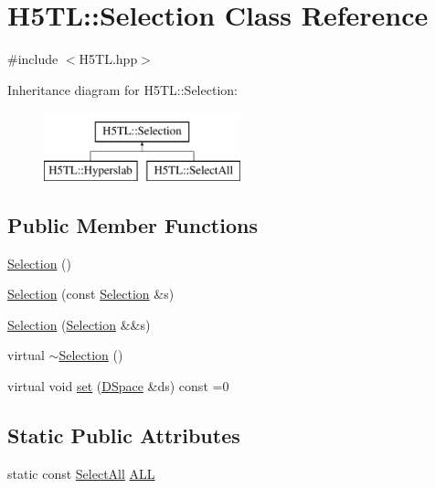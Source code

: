 \hypertarget{class_h5_t_l_1_1_selection}{\section{H5\-T\-L\-:\-:Selection Class Reference}
\label{class_h5_t_l_1_1_selection}
}


{\ttfamily \#include $<$H5\-T\-L.\-hpp$>$}

Inheritance diagram for H5\-T\-L\-:\-:Selection\-:\begin{figure}[H]
\begin{center}
\leavevmode
\includegraphics[height=2.000000cm]{class_h5_t_l_1_1_selection}
\end{center}
\end{figure}
\subsection*{Public Member Functions}
\begin{DoxyCompactItemize}
\item 
\hyperlink{class_h5_t_l_1_1_selection_aeab63be2c41250d0ab36c00356a8f750}{Selection} ()
\item 
\hyperlink{class_h5_t_l_1_1_selection_ab7e340d2861f5e60b0e80381d39ba0c3}{Selection} (const \hyperlink{class_h5_t_l_1_1_selection}{Selection} \&s)
\item 
\hyperlink{class_h5_t_l_1_1_selection_a9594895f58f917d8c450c66583d3f7ff}{Selection} (\hyperlink{class_h5_t_l_1_1_selection}{Selection} \&\&s)
\item 
virtual \hyperlink{class_h5_t_l_1_1_selection_a171d5093cb878eb3e30d0779667fbb13}{$\sim$\-Selection} ()
\item 
virtual void \hyperlink{class_h5_t_l_1_1_selection_af2025c1e456b063868920512aedc05c9}{set} (\hyperlink{class_h5_t_l_1_1_d_space}{D\-Space} \&ds) const =0
\end{DoxyCompactItemize}
\subsection*{Static Public Attributes}
\begin{DoxyCompactItemize}
\item 
static const \hyperlink{class_h5_t_l_1_1_select_all}{Select\-All} \hyperlink{class_h5_t_l_1_1_selection_a32d830ebff3c607e0425fa5d6ef72df0}{A\-L\-L}
\end{DoxyCompactItemize}


